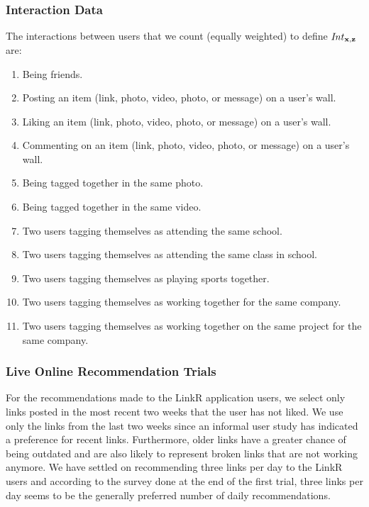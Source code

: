\subsubsection{Interaction Data}
\label{sec:interactions}

The interactions between users that we count (equally weighted) to define
$\mathit{Int}_{\mathbf{x},\mathbf{z}}$ are:

\begin{enumerate}
\item{Being friends.}
\item{Posting an item (link, photo, video, photo, or message) on a user's wall.}
\item{Liking an item (link, photo, video, photo, or message) on a user's wall.}
\item{Commenting on an item (link, photo, video, photo, or message) on a user's wall.}
\item{Being tagged together in the same photo.}
\item{Being tagged together in the same video.}
\item{Two users tagging themselves as attending the same school.}
\item{Two users tagging themselves as attending the same class in school.}
\item{Two users tagging themselves as playing sports together.}
\item{Two users tagging themselves as working together for the same company.}
\item{Two users tagging themselves as working together on the same project for the same company.}
\end{enumerate}

\subsubsection{Live Online Recommendation Trials}

For the recommendations made to the LinkR application users, we select
only links posted in the most recent two weeks that the user has not
liked. We use only the links from the last two weeks since an informal
user study has indicated a preference for recent links.  Furthermore,
older links have a greater chance of being outdated and are also
likely to represent broken links that are not working anymore. We have
settled on recommending three links per day to the LinkR users and
according to the survey done at the end of the first trial, three
links per day seems to be the generally preferred number of
daily recommendations.

